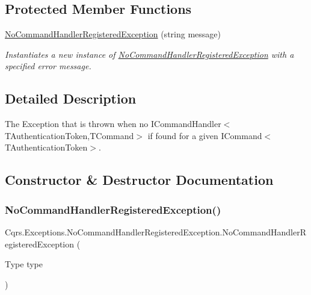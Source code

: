 \subsection*{Protected Member Functions}
\begin{DoxyCompactItemize}
\item 
\hyperlink{classCqrs_1_1Exceptions_1_1NoCommandHandlerRegisteredException_a489f12858f990ea6a84f268e7744ab84_a489f12858f990ea6a84f268e7744ab84}{No\+Command\+Handler\+Registered\+Exception} (string message)
\begin{DoxyCompactList}\small\item\em Instantiates a new instance of \hyperlink{classCqrs_1_1Exceptions_1_1NoCommandHandlerRegisteredException}{No\+Command\+Handler\+Registered\+Exception} with a specified error message. \end{DoxyCompactList}\end{DoxyCompactItemize}


\subsection{Detailed Description}
The Exception that is thrown when no I\+Command\+Handler$<$\+T\+Authentication\+Token,\+T\+Command$>$ if found for a given I\+Command$<$\+T\+Authentication\+Token$>$. 



\subsection{Constructor \& Destructor Documentation}
\mbox{\label{classCqrs_1_1Exceptions_1_1NoCommandHandlerRegisteredException_afe8d9819db3c2f2bd901e04425642e95_afe8d9819db3c2f2bd901e04425642e95}} 
\subsubsection{\texorpdfstring{No\+Command\+Handler\+Registered\+Exception()}{NoCommandHandlerRegisteredException()}\hspace{0.1cm}{\footnotesize\ttfamily [1/2]}}
{\footnotesize\ttfamily Cqrs.\+Exceptions.\+No\+Command\+Handler\+Registered\+Exception.\+No\+Command\+Handler\+Registered\+Exception (\begin{DoxyParamCaption}\item[{Type}]{type }\end{DoxyParamCaption})}



